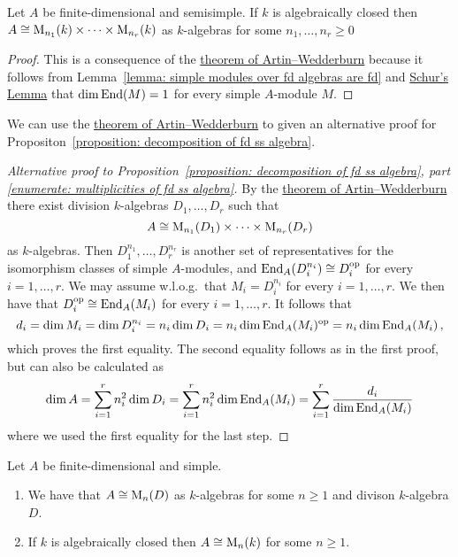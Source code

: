 \begin{corollary}
  \label{corollary: semisimple algebra product of matrix algebras}
  Let $A$ be finite-dimensional and semisimple.
  If $k$ is algebraically closed then $A \cong \operatorname{M}_{n_1}(k) \times \dotsm \times \operatorname{M}_{n_r}(k)$ as $k$-algebras for some $n_1, \dotsc, n_r \geq 0$
\end{corollary}


\begin{proof}
  This is a consequence of the \hyperref[theorem: artin wedderburn theorem]{theorem of Artin--Wedderburn} because it follows from Lemma~\ref{lemma: simple modules over fd algebras are fd} and \hyperref[proposition: schurs lemma for modules]{Schur’s Lemma} that $\dim \operatorname{End}(M) = 1$ for every simple $A$-module $M$.
\end{proof}


\begin{fluff}
  We can use the \hyperref[theorem: artin wedderburn theorem]{theorem of Artin--Wedderburn} to given an alternative proof for Propositon~\ref{proposition: decomposition of fd ss algebra}.
\end{fluff}


\begin{proof}[Alternative proof to Proposition~\ref*{proposition: decomposition of fd ss algebra}, part \ref*{enumerate: multiplicities of fd ss algebra}]
  By the \hyperref[theorem: artin wedderburn theorem]{theorem of Artin--Wedderburn} there exist division $k$-algebras $D_1, \dotsc, D_r$ such that
  \[
          A
    \cong \operatorname{M}_{n_1}(D_1) \times \dotsb \times \operatorname{M}_{n_r}(D_r)
  \]
  as $k$-algebras.
  Then $D_1^{n_1}, \dotsc, D_r^{n_r}$ is another set of representatives for the isomorphism classes of simple $A$-modules, and $\operatorname{End}_A(D_i^{n_i}) \cong D_i^{\operatorname{op}}$ for every $i = 1, \dotsc, r$.
  We may assume w.l.o.g.\ that $M_i = D_i^{n_i}$ for every $i = 1, \dotsc, r$.
  We then have that $D_i^{\operatorname{op}} \cong \operatorname{End}_A(M_i)$ for every $i = 1, \dotsc, r$.
  It follows that
  \[
      d_i
    = \dim M_i
    = \dim D_i^{n_i}
    = n_i \dim D_i
    = n_i \dim \operatorname{End}_A(M_i)^{\operatorname{op}}
    = n_i \dim \operatorname{End}_A(M_i) \,,
  \]
  which proves the first equality.
  The second equality follows as in the first proof, but can also be calculated as
  \[
      \dim A
    = \sum_{i=1}^r n_i^2 \dim D_i
    = \sum_{i=1}^r n_i^2 \dim \operatorname{End}_A(M_i)
    = \sum_{i=1}^r \frac{d_i}{\dim \operatorname{End}_A(M_i)}
  \]
  where we used the first equality for the last step.
\end{proof}


\begin{corollary}[Wedderburn]
  \label{corollary: wedderburn for algebras}
  Let $A$ be finite-dimensional and simple.
  \begin{enumerate}
    \item
      We have that $A \cong \operatorname{M}_n(D)$ as $k$-algebras for some $n \geq 1$ and divison $k$-algebra $D$.
    \item
      If $k$ is algebraically closed then $A \cong \operatorname{M}_n(k)$ for some $n \geq 1$.
  \end{enumerate}
\end{corollary}


